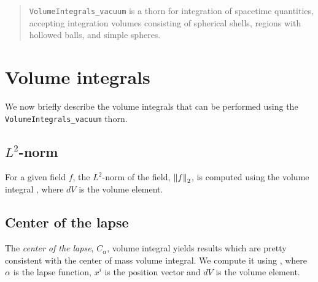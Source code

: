 \linespread{1.0}

\newenvironment{packed_itemize}{
\begin{itemize}
  \setlength{\itemsep}{0.0pt}
  \setlength{\parskip}{0.0pt}
  \setlength{\parsep}{ 0.0pt}
}{\end{itemize}}

\newenvironment{packed_enumerate}{
\begin{enumerate}
  \setlength{\itemsep}{0.0pt}
  \setlength{\parskip}{0.0pt}
  \setlength{\parsep}{ 0.0pt}
}{\end{enumerate}}

\begin{abstract}
  \texttt{VolumeIntegrals\_vacuum} is a thorn for integration of
  spacetime quantities, accepting integration volumes consisting of
  spherical shells, regions with hollowed balls, and simple spheres.
\end{abstract}

\section{Volume integrals}
\label{sec:volume_integrals}

We now briefly describe the volume integrals that can be performed
using the \texttt{VolumeIntegrals\_vacuum} thorn.

\subsection{$L^{2}$-norm}
\label{sec:L2_norm_integral}

For a given field $f$, the $L^{2}$-norm of the field, $\left\lVert f\right\rVert_{2}$,
is computed using the volume integral
\beq
{}\; ,
\eeq
where $dV$ is the volume element.

\subsection{Center of the lapse}
\label{sec:center_of_lapse}

The \emph{center of the lapse}, $C_{\alpha}$, volume integral yields
results which are pretty consistent with the center of mass volume
integral. We compute it using
\beq
{}\; ,
\eeq
where $\alpha$ is the lapse function, $x^{i}$ is the position vector
and $dV$ is the volume element.

